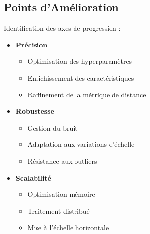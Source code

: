 \subsection{Points d'Amélioration}
Identification des axes de progression :

\begin{itemize}
    \item \textbf{Précision}
    \begin{itemize}
        \item Optimisation des hyperparamètres
        \item Enrichissement des caractéristiques
        \item Raffinement de la métrique de distance
    \end{itemize}

    \item \textbf{Robustesse}
    \begin{itemize}
        \item Gestion du bruit
        \item Adaptation aux variations d'échelle
        \item Résistance aux outliers
    \end{itemize}

    \item \textbf{Scalabilité}
    \begin{itemize}
        \item Optimisation mémoire
        \item Traitement distribué
        \item Mise à l'échelle horizontale
    \end{itemize}
\end{itemize}